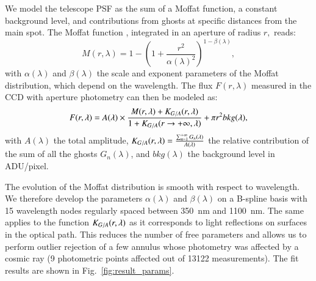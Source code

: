 We model the \SD telescope PSF as the sum of a Moffat function, a constant background level, and contributions from ghosts at specific distances from the main spot. The Moffat function \citep{moffat}, integrated in an aperture of radius $r,$ reads:
\begin{equation}
M(r, \lambda)= 1 - \left( 1+\frac{r^2}{\alpha(\lambda)^2} \right)^{1-\beta(\lambda)},
\end{equation}
with $\alpha(\lambda)$ and $\beta(\lambda)$ the scale and exponent parameters of the Moffat distribution, which depend on the wavelength. The flux $F(r, \lambda)$ measured in the CCD with aperture photometry can then be modeled as: 
\begin{equation}
F(r, \lambda) = A(\lambda) \times \frac{M(r, \lambda) + K_{G/A}(r, \lambda)}{1 + K_{G/A}(r \rightarrow +\infty, \lambda)} + \pi r^2 bkg(\lambda),
\label{eq:moffat_model}
\end{equation}
with $A(\lambda)$ the total amplitude, $K_{G/A}(r, \lambda) = \frac{\sum_{n=1}^{+\infty} G_n(\lambda)}{A(\lambda)}$ the relative contribution of the sum of all the ghosts $G_n(\lambda)$, and $bkg(\lambda)$ the background level in ADU/pixel. 

The evolution of the Moffat distribution is smooth with respect to wavelength. We therefore develop the parameters $\alpha(\lambda)$ and $\beta(\lambda)$  on a B-spline basis with 15 wavelength nodes regularly spaced between \SI{350}{\nano\meter} and \SI{1100}{\nano\meter}. The same applies to the function $K_{G/A}(r, \lambda)$ as it corresponds to light reflections on surfaces in the optical path. This reduces the number of free parameters and allows us to perform outlier rejection of a few annulus whose photometry was affected by a cosmic ray (9 photometric points affected out of 13122 measurements). The fit results are shown in Fig.~\ref{fig:result_params}. 

